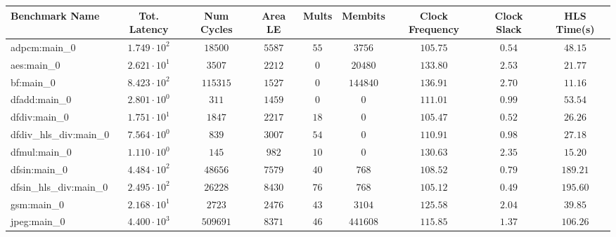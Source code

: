 \begin{tabular}{|l|c|c|c|c|c|c|c|c|}
\hline
Benchmark Name          & Tot. Latency           & Num Cycles & Area LE   & Mults   & Membits    & Clock Frequency & Clock Slack & HLS Time(s) \\
\hline
adpcm:main\_0           & $ 1.749 \cdot 10^{2} $ & $ 18500  $ & $ 5587  $ & $ 55  $ & $ 3756   $ & $ 105.75      $ & $ 0.54    $ & $ 48.15   $ \\
aes:main\_0             & $ 2.621 \cdot 10^{1} $ & $ 3507   $ & $ 2212  $ & $ 0   $ & $ 20480  $ & $ 133.80      $ & $ 2.53    $ & $ 21.77   $ \\
bf:main\_0              & $ 8.423 \cdot 10^{2} $ & $ 115315 $ & $ 1527  $ & $ 0   $ & $ 144840 $ & $ 136.91      $ & $ 2.70    $ & $ 11.16   $ \\
dfadd:main\_0           & $ 2.801 \cdot 10^{0} $ & $ 311    $ & $ 1459  $ & $ 0   $ & $ 0      $ & $ 111.01      $ & $ 0.99    $ & $ 53.54   $ \\
dfdiv:main\_0           & $ 1.751 \cdot 10^{1} $ & $ 1847   $ & $ 2217  $ & $ 18  $ & $ 0      $ & $ 105.47      $ & $ 0.52    $ & $ 26.26   $ \\
dfdiv\_hls\_div:main\_0 & $ 7.564 \cdot 10^{0} $ & $ 839    $ & $ 3007  $ & $ 54  $ & $ 0      $ & $ 110.91      $ & $ 0.98    $ & $ 27.18   $ \\
dfmul:main\_0           & $ 1.110 \cdot 10^{0} $ & $ 145    $ & $ 982   $ & $ 10  $ & $ 0      $ & $ 130.63      $ & $ 2.35    $ & $ 15.20   $ \\
dfsin:main\_0           & $ 4.484 \cdot 10^{2} $ & $ 48656  $ & $ 7579  $ & $ 40  $ & $ 768    $ & $ 108.52      $ & $ 0.79    $ & $ 189.21  $ \\
dfsin\_hls\_div:main\_0 & $ 2.495 \cdot 10^{2} $ & $ 26228  $ & $ 8430  $ & $ 76  $ & $ 768    $ & $ 105.12      $ & $ 0.49    $ & $ 195.60  $ \\
gsm:main\_0             & $ 2.168 \cdot 10^{1} $ & $ 2723   $ & $ 2476  $ & $ 43  $ & $ 3104   $ & $ 125.58      $ & $ 2.04    $ & $ 39.85   $ \\
jpeg:main\_0            & $ 4.400 \cdot 10^{3} $ & $ 509691 $ & $ 8371  $ & $ 46  $ & $ 441608 $ & $ 115.85      $ & $ 1.37    $ & $ 106.26  $ \\

\end{tabular}
